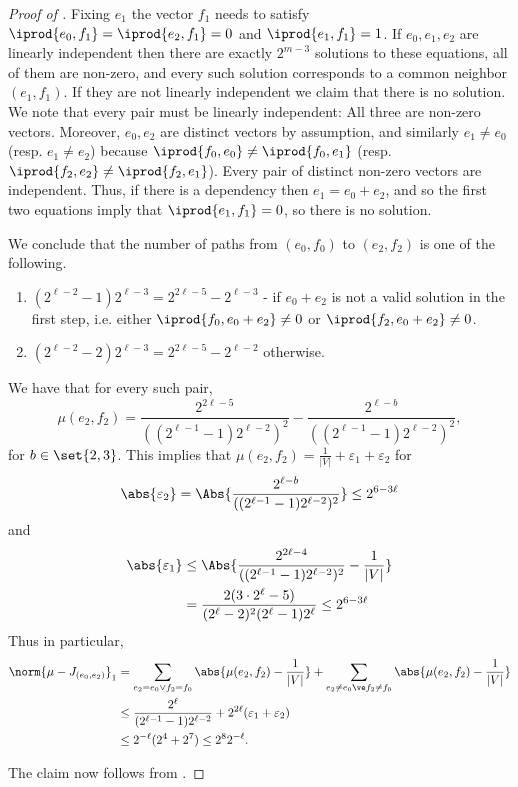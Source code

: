 \begin{proof}[Proof of ]
    Fixing \(e_1\) the vector \(f_1\) needs to satisfy \(\iprod{e_0,f_1}=\iprod{e_2,f_1}=0\) and \(\iprod{e_1,f_1} = 1\). If \(e_0,e_1,e_2\) are linearly independent then there are exactly \(2^{m-3}\) solutions to these equations, all of them are non-zero, and every such solution corresponds to a common neighbor \((e_1,f_1)\). If they are not linearly independent we claim that there is no solution. We note that every pair must be linearly independent: All three are non-zero vectors. Moreover, \(e_0,e_2\) are distinct vectors by assumption, and similarly \(e_1 \ne e_0\) (resp. \(e_1 \ne e_2\)) because \(\iprod{f_0,e_0} \ne \iprod{f_0,e_1}\) (resp. \(\iprod{f_2,e_2} \ne \iprod{f_2,e_1}\)). Every pair of distinct non-zero vectors are independent. Thus, if there is a dependency then \(e_1 = e_0+e_2\), and so the first two equations imply that \(\iprod{e_1,f_1} = 0\), so there is no solution. 
    
    We conclude that the number of paths from \((e_0,f_0)\) to \((e_2,f_2)\) is one of the following.
    \begin{enumerate}
        \item \((2^{\ell-2}-1)2^{\ell-3}=2^{2\ell-5}-2^{\ell-3}\) - if \(e_0 + e_2\) is not a valid solution in the first step, i.e. either \(\iprod{f_0,e_0+e_2} \ne 0\) or \(\iprod{f_2,e_0+e_2} \ne 0\).
        \item \((2^{\ell-2}-2)2^{\ell-3} = 2^{2\ell-5}-2^{\ell-2}\) otherwise.
    \end{enumerate}
    We have that for every such pair,
    \[\mu(e_2,f_2) = \frac{2^{2\ell-5}}{((2^{\ell-1}-1)2^{\ell-2})^2} - \frac{2^{\ell-b}}{((2^{\ell-1}-1)2^{\ell-2})^2},\]
    for \(b\in \set{2,3}\).
    This implies that \(\mu(e_2,f_2) = \frac{1}{|V|} + \varepsilon_1 + \varepsilon_2\) for
    \[\abs{\varepsilon_2} = \Abs{\frac{2^{\ell-b}}{((2^{\ell-1}-1)2^{\ell-2})^2}} \leq 2^{6-3\ell}\]
    and 
    \begin{align*}
        \abs{\varepsilon_1} &\leq  \Abs{\frac{2^{2\ell-4}}{((2^{\ell-1}-1)2^{\ell-2})^2} - \frac{1}{|V|}} \\
        &= \frac{2(3 \cdot 2^\ell - 5)}{(2^\ell-2)^2(2^\ell-1)2^\ell} \leq 2^{6-3\ell}
    \end{align*} 
    Thus in particular,
    \begin{align*}
        \norm{\mu - J_{(e_0,e_2)}}_1 &= \sum_{e_2 = e_0 \vee f_2=f_0} \abs{\mu(e_2,f_2) - \frac{1}{|V|}} + \sum_{e_2 \ne e_0 \ve f_2 \ne f_0} \abs{\mu(e_2,f_2) - \frac{1}{|V|}}\\
        &\leq \frac{2^\ell}{(2^{\ell-1}-1)2^{\ell-2}} + 2^{2\ell}(\varepsilon_1 + \varepsilon_2) \\
        &\leq 2^{-\ell} (2^4+2^7) \leq 2^8 2^{-\ell}.
    \end{align*}

    The claim now follows from .
\end{proof}

